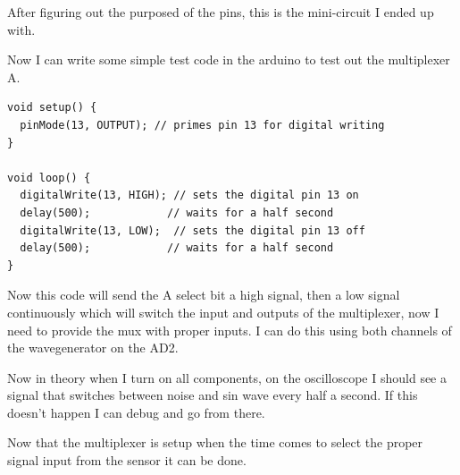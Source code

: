 \documentclass{article}
\begin{document}
After figuring out the purposed of the pins, this is the mini-circuit I ended up with.
\begin{center}
\end{center}
Now I can write some simple test code in the arduino to test out the multiplexer A.
\begin{lstlisting}[language=Arduino, caption=Multiplexer Test Code]
void setup() {
  pinMode(13, OUTPUT); // primes pin 13 for digital writing
}

void loop() {
  digitalWrite(13, HIGH); // sets the digital pin 13 on
  delay(500);            // waits for a half second
  digitalWrite(13, LOW);  // sets the digital pin 13 off
  delay(500);            // waits for a half second
}
\end{lstlisting}
Now this code will send the A select bit a high signal, then a low signal continuously which will switch the input and outputs of the multiplexer, now I need to provide the mux with proper inputs. I can do this using both channels of the wavegenerator on the AD2.
\begin{center}
\end{center}
Now in theory when I turn on all components, on the oscilloscope I should see a signal that switches between noise and sin wave every half a second. If this doesn't happen I can debug and go from there.
\begin{center}
\end{center}
Now that the multiplexer is setup when the time comes to select the proper signal input from the sensor it can be done.
\newpage
\end{document}
